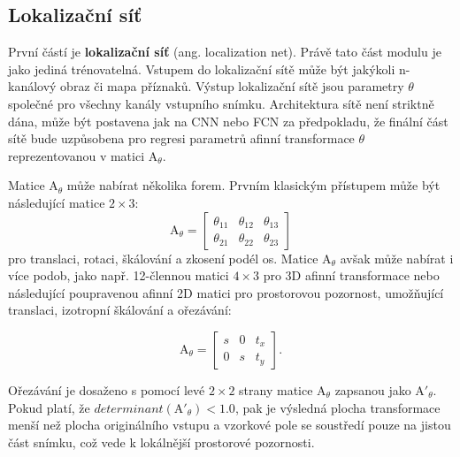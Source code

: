 \subsection{Lokalizační síť}

První částí je \textbf{lokalizační síť} (ang. localization net). Právě tato část modulu je jako jediná trénovatelná. Vstupem do lokalizační sítě může být jakýkoli n-kanálový obraz či mapa příznaků. Výstup lokalizační sítě jsou parametry $\theta$ společné pro všechny kanály vstupního snímku. Architektura sítě není striktně dána, může být postavena jak na CNN nebo FCN za předpokladu, že finální část sítě bude uzpůsobena pro regresi parametrů afinní transformace $\theta$ reprezentovanou v matici ${\displaystyle \mathrm {A} }_\theta$.

Matice ${\displaystyle \mathrm {A} }_\theta$ může nabírat několika forem. Prvním klasickým přístupem může být následující matice $2\times3$:
\begin{equation}
    {\displaystyle \mathrm {A} }_\theta = 
    \begin{bmatrix}
        \theta_{11} & \theta_{12} & \theta_{13} \\
        \theta_{21} & \theta_{22} & \theta_{23}
    \end{bmatrix}
    \label{eq:stn_6_theta}
\end{equation}
pro translaci, rotaci, škálování a zkosení podél os. Matice ${\displaystyle \mathrm {A} }_\theta$ avšak může nabírat i více podob, jako např. 12-člennou matici $4\times3$ pro 3D afinní transformace nebo následující poupravenou afinní 2D matici pro prostorovou pozornost, umožňující translaci, izotropní škálování a ořezávání:

\begin{equation}
    {\displaystyle \mathrm {A} }_\theta = 
    \begin{bmatrix}
        s & 0 & t_x \\
        0 & s & t_y
    \end{bmatrix}.
    \label{eq:stn_3_theta}
\end{equation}

Ořezávání je dosaženo s pomocí levé $2\times2$ strany matice ${\displaystyle \mathrm {A} }_\theta$ zapsanou jako ${\displaystyle \mathrm {A'} }_\theta$. Pokud platí, že $determinant({\displaystyle \mathrm {A'} }_\theta) < 1.0$, pak je výsledná plocha transformace menší než plocha originálního vstupu a vzorkové pole se soustředí pouze na jistou část snímku, což vede k lokálnější prostorové pozornosti.

